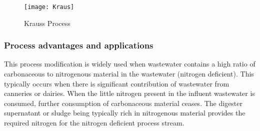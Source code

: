 \begin{figure}[h!]
\begin{center}
\texttt{[image: Kraus]}
\caption{Krauss Process}
\end{center}
\end{figure}

\subsubsection{Process advantages and applications}
This process modification is widely used when wastewater contains a high ratio of carbonaceous to nitrogenous material in the wastewater (nitrogen deficient).  This typically occurs when there is significant contribution of wastewater from canneries or dairies.  When the little nitrogen present in the influent wastewater is consumed, further consumption of carbonaceous material ceases.  The digester supernatant or sludge being typically rich in nitrogenous material provides the required nitrogen for the nitrogen deficient process stream.

\newpage
